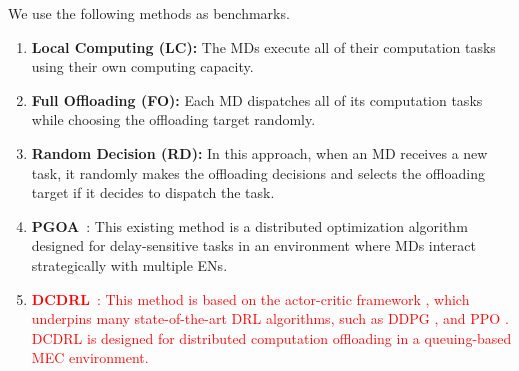 \documentclass[10pt, journal,letterpaper]{IEEEtran}
\begin{document}
We use the following methods as benchmarks.
\begin{enumerate}

\item \textbf{Local Computing (LC):} The MDs execute all of their computation tasks using their own computing capacity.

\item \textbf{Full Offloading (FO):} Each MD dispatches all of its computation tasks while choosing the offloading target randomly. %

\item \textbf{Random Decision (RD):} In this approach, when an MD receives a new task, it randomly makes the offloading decisions and selects the offloading target if it decides to dispatch the task. %

\item \textbf{PGOA}~\cite{yang2018distributed}: 
This existing method is a distributed optimization algorithm designed for delay-sensitive tasks in an environment where MDs interact strategically with multiple ENs. %


\item \textcolor{red}{\textbf{DCDRL}~\cite{qiu2020distributed}: This method is based on the actor-critic framework \cite{NIPS1999_6449f44a}, which underpins many state-of-the-art DRL algorithms, such as DDPG \cite{lillicrap2015continuous}, and PPO \cite{schulman2017proximal}. DCDRL is designed for distributed computation offloading in a queuing-based MEC environment.} %



	

\end{enumerate}



\end{document}
